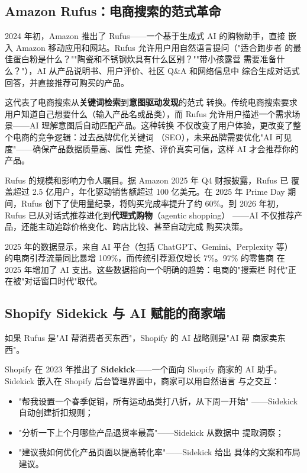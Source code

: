 \subsection{Amazon Rufus：电商搜索的范式革命}
\label{subsec:rufus}

2024 年初，Amazon 推出了 Rufus——一个基于生成式 AI 的购物助手，直接
嵌入 Amazon 移动应用和网站。Rufus 允许用户用自然语言提问（"适合跑步者
的最佳蛋白粉是什么？""陶瓷和不锈钢炊具有什么区别？""带小孩露营
需要准备什么？"），AI 从产品说明书、用户评价、社区 Q\&A 和网络信息中
综合生成对话式回答，并直接推荐可购买的产品。

这代表了电商搜索从\textbf{关键词检索}到\textbf{意图驱动发现}的范式
转换。传统电商搜索要求用户知道自己想要什么（输入产品名或品类），而
Rufus 允许用户描述一个需求场景——AI 理解意图后自动匹配产品。这种转换
不仅改变了用户体验，更改变了整个电商的竞争逻辑：过去品牌优化关键词
（SEO），未来品牌需要优化"AI 可见度"——确保产品数据质量高、属性
完整、评价真实可信，这样 AI 才会推荐你的产品。

Rufus 的规模和影响力令人瞩目。据 Amazon 2025 年 Q4 财报披露，Rufus 已
覆盖超过 2.5 亿用户，年化驱动销售额超过 100 亿美元。在 2025 年 Prime
Day 期间，Rufus 创下了使用量纪录，将购买完成率提升了约 60\%。到 2026
年初，Rufus 已从对话式推荐进化到\textbf{代理式购物}（agentic shopping）
——AI 不仅推荐产品，还能主动追踪价格变化、跨店比较、甚至自动完成
购买决策。

2025 年的数据显示，来自 AI 平台（包括 ChatGPT、Gemini、Perplexity 等）
的电商引荐流量同比暴增 109\%，而传统引荐源仅增长 7\%。97\% 的零售商
在 2025 年增加了 AI 支出。这些数据指向一个明确的趋势：电商的"搜索栏
时代"正在被"对话窗口时代"取代。


\subsection{Shopify Sidekick 与 AI 赋能的商家端}
\label{subsec:shopify-sidekick}

如果 Rufus 是"AI 帮消费者买东西"，Shopify 的 AI 战略则是"AI 帮
商家卖东西"。

Shopify 在 2023 年推出了 \textbf{Sidekick}——一个面向 Shopify 商家的
AI 助手。Sidekick 嵌入在 Shopify 后台管理界面中，商家可以用自然语言
与之交互：

\begin{itemize}
  \item "帮我设置一个春季促销，所有运动品类打八折，从下周一开始"
    ——Sidekick 自动创建折扣规则；
  \item "分析一下上个月哪些产品退货率最高"——Sidekick 从数据中
    提取洞察；
  \item "建议我如何优化产品页面以提高转化率"——Sidekick 给出
    具体的文案和布局建议。
\end{itemize}

